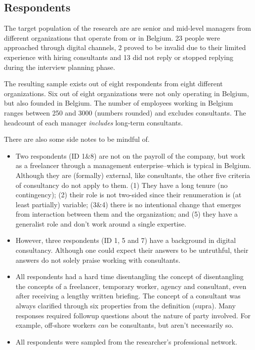 \documentclass[
  man,floatsintext]{apa6}
\begin{document}
\subsection{Respondents}\label{respondents}

The target population of the research are are senior and mid-level managers from different organizations that operate from or in Belgium. 23 people were approached through digital channels, 2 proved to be invalid due to their limited experience with hiring consultants and 13 did not reply or stopped replying during the interview planning phase.

The resulting sample exists out of eight respondents from eight different organizations. Six out of eight organizations were not only operating in Belgium, but also founded in Belgium. The number of employees working in Belgium ranges between 250 and 3000 (numbers rounded) and excludes consultants. The headcount of each manager \emph{includes} long-term consultants.

There are also some side notes to be mindful of.

\begin{itemize}
\item
  Two respondents (ID 1\&8) are not on the payroll of the company, but work as a freelancer through a management enterprise--which is typical in Belgium. Although they are (formally) external, like consultants, the other five criteria of consultancy do not apply to them. (1) They have a long tenure (no contingency); (2) their role is not two-sided since their renumeration is (at least partially) variable; (3\&4) there is no intentional change that emerges from interaction between them and the organization; and (5) they have a generalist role and don't work around a single expertise.
\item
  However, three respondents (ID 1, 5 and 7) have a background in digital consultancy. Although one could expect their answers to be untruthful, their answers do not solely praise working with consultants.
\item
  All respondents had a hard time disentangling the concept of disentangling the concepts of a freelancer, temporary worker, agency and consultant, even after receiving a lengthy written briefing. The concept of a consultant was always clarified through six properties from the definition (supra). Many responses required followup questions about the nature of party involved. For example, off-shore workers \emph{can} be consultants, but aren't necessarily so.
\item
  All respondents were sampled from the researcher's professional network.
\end{itemize}
\end{document}
